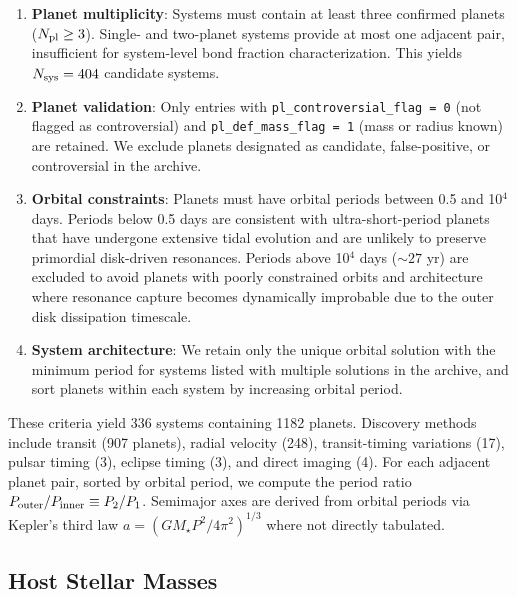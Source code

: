 \documentclass[twocolumn,usenatbib]{mnras}
\begin{document}
\begin{enumerate}
  \item \textbf{Planet multiplicity}: Systems must contain at least three
        confirmed planets ($N_{\rm pl} \geq 3$). Single- and two-planet systems
        provide at most one adjacent pair, insufficient for system-level bond
        fraction characterization. This yields $N_{\rm sys} = 404$ candidate
        systems.
  \item \textbf{Planet validation}: Only entries with
        \texttt{pl\_controversial\_flag\,= 0} (not flagged as controversial)
        and \texttt{pl\_def\_mass\_flag\,= 1} (mass or radius known) are
        retained. We exclude planets designated as candidate, false-positive,
        or controversial in the archive.
  \item \textbf{Orbital constraints}: Planets must have orbital periods
        between 0.5 and 10$^4$ days. Periods below 0.5 days are consistent
        with ultra-short-period planets that have undergone extensive tidal
        evolution and are unlikely to preserve primordial disk-driven
        resonances\citep{wickrama2013,meibom2015}. Periods above 10$^4$ days
        ($\sim 27$ yr) are excluded to avoid planets with poorly constrained
        orbits and architecture where resonance capture becomes dynamically
        improbable due to the outer disk dissipation
        timescale\citep{rasio2004}.
  \item \textbf{System architecture}: We retain only the unique orbital
        solution with the minimum period for systems listed with multiple
        solutions in the archive, and sort planets within each system by
        increasing orbital period.
\end{enumerate}

These criteria yield 336 systems containing 1182 planets. Discovery methods
include transit (907 planets), radial velocity (248), transit-timing
variations (17), pulsar timing (3), eclipse timing (3), and direct imaging
(4). For each adjacent planet pair, sorted by orbital period, we compute the
period ratio $P_{\rm outer} / P_{\rm inner} \equiv P_2/P_1$. Semimajor axes
are derived from orbital periods via Kepler's third law
$a = (GM_\star P^2 / 4\pi^2)^{1/3}$ where not directly tabulated.

\subsection{Host Stellar Masses}
\label{sec:stellar_masses}
\end{document}
